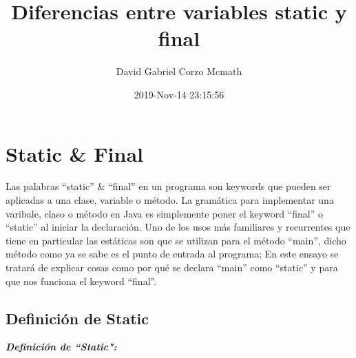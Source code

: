 \documentclass{article}
\title{Diferencias entre variables static y final}
\author{David Gabriel Corzo Mcmath}
\date{2019-Nov-14 23:15:56}
\begin{document}
\maketitle

\section{Static \& Final}
Las palabras ``static'' \& ``final'' en un programa son keywords que pueden ser aplicadas a una clase, variable o método. La gramática para implementar una varibale, claso o método en Java es simplemente poner el keyword ``final'' o ``static'' al iniciar la declaración. Uno de los usos más familiares y recurrentes que tiene en particular las estáticas son que se utilizan para el método ``main'', dicho método como ya se sabe es el punto de entrada al programa; En este ensayo se tratará de explicar cosas como por qué se declara ``main'' como ``static'' y para que nos funciona el keyword ``final''.

\subsection{Definición de Static}
\emph{\textbf{Definición de ``Static":} }
\end{document}
